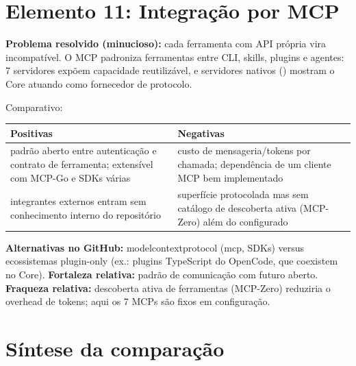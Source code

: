 \clearpage
\section{Elemento 11: Integração por MCP}


\begin{funcao}
\textbf{Problema resolvido (minucioso):} cada ferramenta com API própria vira
incompatível. O MCP padroniza ferramentas entre CLI, skills, plugins e agentes:
7 servidores expõem capacidade reutilizável, e servidores nativos
() mostram o Core atuando como fornecedor de protocolo.
\end{funcao}

\begin{resultado}
Comparativo:\par
\smallskip
{\footnotesize
\begin{tabularx}{\linewidth}{YY}
\toprule
Positivas & Negativas \\
\midrule
padrão aberto entre autenticação e contrato de ferramenta; extensível com MCP-Go
e SDKs várias & custo de mensageria/tokens por chamada; dependência de um cliente
MCP bem implementado \\
integrantes externos entram sem conhecimento interno do repositório &
superfície protocolada mas sem catálogo de descoberta ativa (MCP-Zero) além do
configurado \\
\bottomrule
\end{tabularx}\par}
\end{resultado}

\begin{metodo}
\textbf{Alternativas no GitHub:} modelcontextprotocol (mcp, SDKs) versus
ecossistemas plugin-only (ex.: plugins TypeScript do OpenCode, que coexistem no
Core). \textbf{Fortaleza relativa:} padrão de comunicação com futuro aberto.
\textbf{Fraqueza relativa:} descoberta ativa de ferramentas (MCP-Zero) reduziria
o overhead de tokens; aqui os 7 MCPs são fixos em configuração.
\end{metodo}

\clearpage
\section{Síntese da comparação}

